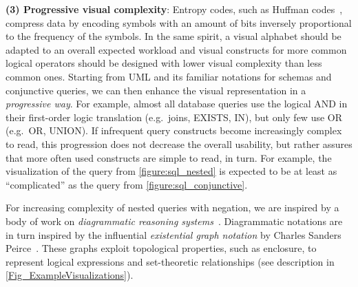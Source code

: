 \documentclass[letterpaper,11pt]{article}
\newcommand{\sql}[1]{\textup{\textsf{\small#1}}}
\begin{document}
\textbf{(3) Progressive visual complexity}: 
%
Entropy codes, such as Huffman codes~\cite{cover:thomas:2006}, 
compress data by encoding symbols with an amount of bits inversely proportional to the frequency of the symbols.
%
%
%
%
%
%
%
%
%
%
In the same spirit, a visual alphabet should be adapted to an overall expected workload and visual constructs for more common logical operators should be designed with lower visual complexity than less common ones. 
Starting from UML and its familiar notations for schemas and conjunctive queries, 
we can then enhance the visual representation in a \emph{progressive way}. 
For example, almost all database queries use the logical AND in their first-order logic translation (e.g.\ joins, \sql{EXISTS}, \sql{IN}), but only few use OR (e.g.\ \sql{OR}, \sql{UNION}). 
If infrequent query constructs become increasingly complex to read, this progression does not decrease the overall usability, but rather assures that more often used constructs are simple to read, in turn.
%
For example, the visualization of the query from \autoref{figure:sql_nested}
is expected to be at least as ``complicated'' as the query from \autoref{figure:sql_conjunctive}.

For increasing complexity of nested queries with negation, we are inspired by a body of work on \emph{diagrammatic reasoning systems}~\cite{DBLP:conf/iccs/Howse08}. 
Diagrammatic notations are in turn inspired by the influential \emph{existential graph notation} by Charles Sanders Peirce~\cite{peirce:1933,Roberts:1992,Shin:2002}.
These graphs exploit topological properties, such as enclosure, to represent logical expressions and set-theoretic relationships
%
%
(see description in \autoref{Fig_ExampleVisualizations}).








\end{document}
